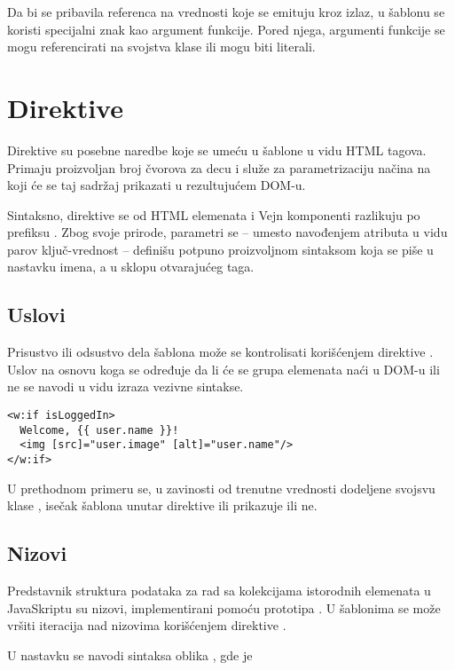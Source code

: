 Da bi se pribavila referenca na vrednosti koje se emituju kroz izlaz, u šablonu se koristi specijalni znak \code{\#} kao argument funkcije.
Pored njega, argumenti funkcije se mogu referencirati na svojstva klase ili mogu biti literali.

\section{Direktive}

Direktive su posebne naredbe koje se umeću u šablone u vidu HTML tagova.
Primaju proizvoljan broj čvorova za decu i služe za parametrizaciju načina na koji će se taj sadržaj prikazati u rezultujućem DOM-u.

Sintaksno, direktive se od HTML elemenata i Vejn komponenti razlikuju po prefiksu .
Zbog svoje prirode, parametri se -- umesto navođenjem atributa u vidu parov ključ-vrednost -- definišu potpuno proizvoljnom sintaksom koja se piše u nastavku imena, a u sklopu otvarajućeg taga.

\subsection{Uslovi}

Prisustvo ili odsustvo dela šablona može se kontrolisati korišćenjem direktive .
Uslov na osnovu koga se određuje da li će se grupa elemenata naći u DOM-u ili ne se navodi u vidu izraza vezivne sintakse.

\begin{verbatim}
<w:if isLoggedIn>
  Welcome, {{ user.name }}!
  <img [src]="user.image" [alt]="user.name"/>
</w:if>
\end{verbatim}

U prethodnom primeru se, u zavinosti od trenutne vrednosti dodeljene svojsvu klase , isečak šablona unutar direktive  ili prikazuje ili ne.

\subsection{Nizovi}

Predstavnik struktura podataka za rad sa kolekcijama istorodnih elemenata u JavaSkriptu su nizovi, implementirani pomoću prototipa .
U šablonima se može vršiti iteracija nad nizovima korišćenjem direktive .

U nastavku se navodi sintaksa oblika , gde je

